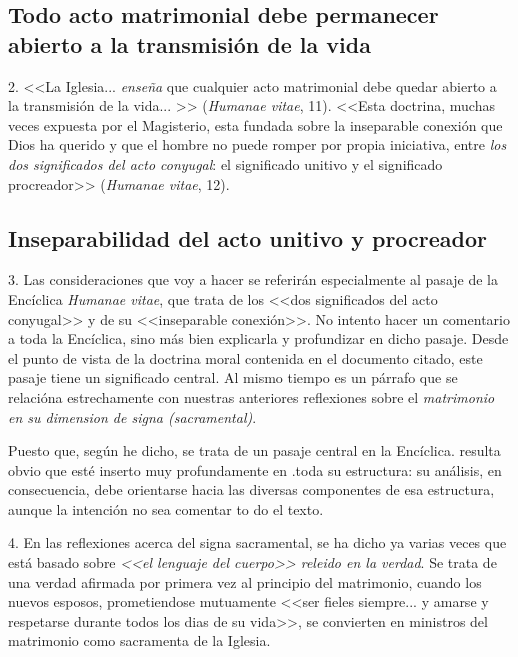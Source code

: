 \documentclass[letterpaper]{report}
\begin{document}
		\subsection{Todo acto matrimonial debe permanecer abierto a la transmisi\'on
		 de la vida}
			2. <<La Iglesia... \textit{ense\~na} que cualquier acto matrimonial 
			debe quedar abierto a la transmisi\'on de la vida... >> 
			(\textit{\textit{Humanae vitae}}, 11). <<Esta doctrina, muchas veces expuesta 
			por el Magisterio, esta fundada sobre la inseparable conexi\'on 
			que Dios ha querido y que el hombre no puede 
			romper por propia iniciativa, entre \textit{los dos significados del 
			acto conyugal}: el significado unitivo y el significado 
			procreador>> (\textit{\textit{Humanae vitae}}, 12).
			
		\subsection{Inseparabilidad del acto unitivo y procreador}
			3. Las consideraciones que voy a hacer se referir\'an 
			especialmente al pasaje de la Enc\'iclica \textit{Humanae vitae}, que 
			trata de los <<dos significados del acto conyugal>> y de su 
			<<inseparable conexi\'on>>. No intento hacer un comentario a 
			toda la Enc\'iclica, sino m\'as bien explicarla y profundizar en 
			dicho pasaje. Desde el punto de vista de la doctrina moral 
			contenida en el documento citado, este pasaje tiene un 
			significado central. Al mismo tiempo es un p\'arrafo que se 
			relaci\'ona estrechamente con nuestras anteriores reflexiones 
			sobre el \textit{matrimonio en su dimension de signa (sacramental)}.
			 
			Puesto que, seg\'un he dicho, se trata de un pasaje central 
			en la Enc\'iclica. resulta obvio que est\'e inserto muy 
			profundamente en .toda su estructura: su an\'alisis, en 
			consecuencia, debe orientarse hacia las diversas componentes 
			de esa estructura, aunque la intenci\'on no sea comentar 
			to do el texto.
			
			4. En las reflexiones acerca del signa sacramental, se 
			ha dicho ya varias veces que est\'a basado sobre \textit{<<el 
			lenguaje del cuerpo>> releido en la verdad}. Se trata de una verdad 
			afirmada por primera vez al principio del matrimonio, 
			cuando los nuevos esposos, prometiendose mutuamente 
			<<ser fieles siempre... y amarse y respetarse durante todos 
			los dias de su vida>>, se convierten en ministros del 
			matrimonio como sacramenta de la Iglesia.
			 
\end{document}
